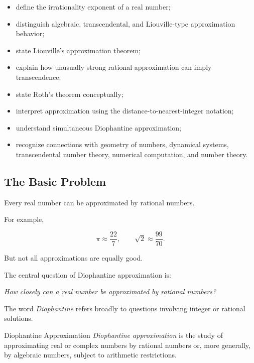{\begin{itemize}
    \item define the irrationality exponent of a real number;
    \item distinguish algebraic, transcendental, and Liouville-type approximation behavior;
    \item state Liouville's approximation theorem;
    \item explain how unusually strong rational approximation can imply transcendence;
    \item state Roth's theorem conceptually;
    \item interpret approximation using the distance-to-nearest-integer notation;
    \item understand simultaneous Diophantine approximation;
    \item recognize connections with geometry of numbers, dynamical systems,
    transcendental number theory, numerical computation, and number theory.
\end{itemize}
}

\subsection{The Basic Problem}
\label{subsec:diophantine-approximation-basic-problem}

Every real number can be approximated by rational numbers.

For example,

\[ \pi\approx\frac{22}{7},\qquad \sqrt2\approx\frac{99}{70}. \]

But not all approximations are equally good.

The central question of Diophantine approximation is:

\begin{center}
\emph{How closely can a real number be approximated by rational numbers?}
\end{center}

The word \emph{Diophantine} refers broadly to questions involving integer or
rational solutions.

\begin{definitionbox}{Diophantine Approximation}
\emph{Diophantine approximation} is the study of approximating real or
complex numbers by rational numbers or, more generally, by algebraic numbers,
subject to arithmetic restrictions.
\end{definitionbox}

